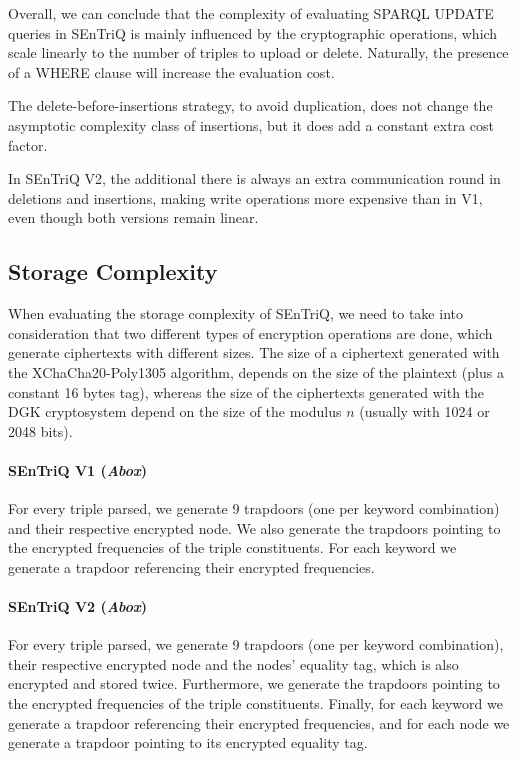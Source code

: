Overall, we can conclude that the complexity of evaluating \gls{SPARQL} UPDATE queries in \gls{SEnTriQ} is mainly influenced by the cryptographic operations, which scale linearly to the number of triples to upload or delete. Naturally, the presence of a WHERE clause will increase the evaluation cost.

The delete-before-insertions strategy, to avoid duplication, does not change the asymptotic complexity class of insertions, but it does add a constant extra cost factor.

In \gls{SEnTriQ} V2, the additional there is always an extra communication round in deletions and insertions, making write operations more expensive than in V1, even though both versions remain linear.


\subsection{Storage Complexity}

When evaluating the storage complexity of \gls{SEnTriQ}, we need to take into consideration that two different types of encryption operations are done, which generate ciphertexts with different sizes. The size of a ciphertext generated with the XChaCha20-Poly1305 algorithm, depends on the size of the plaintext (plus a constant 16 bytes tag), whereas the size of the ciphertexts generated with the \gls{DGK} cryptosystem depend on the size of the modulus $n$ (usually with 1024 or 2048 bits).

\paragraph{SEnTriQ V1 (\emph{Abox})} For every triple parsed, we generate 9 trapdoors (one per keyword combination) and their respective encrypted node. We also generate the trapdoors pointing to the encrypted frequencies of the triple constituents. For each keyword we generate a trapdoor referencing their encrypted frequencies. 

\paragraph{SEnTriQ V2 (\emph{Abox})} For every triple parsed, we generate 9 trapdoors (one per keyword combination), their respective encrypted node and the nodes' equality tag, which is also encrypted and stored twice. Furthermore, we generate the trapdoors pointing to the encrypted frequencies of the triple constituents. Finally, for each keyword we generate a trapdoor referencing their encrypted frequencies, and for each node we generate a trapdoor pointing to its encrypted equality tag.

